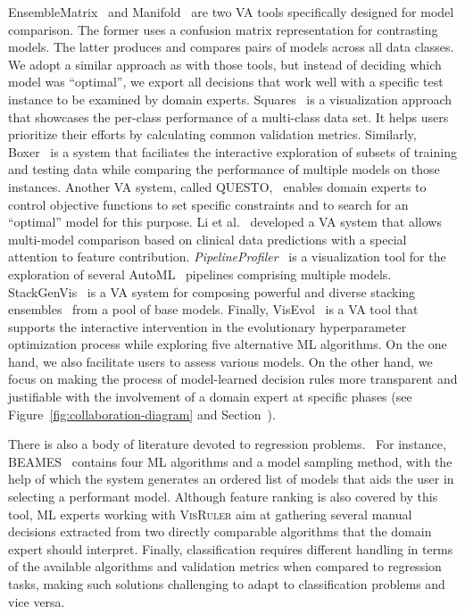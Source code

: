 EnsembleMatrix~\cite{Talbot2009EnsembleMatrix} and Manifold~\cite{Zhang2019Manifold} are two VA tools specifically designed for model comparison. The former uses a confusion matrix representation for contrasting models. The latter produces and compares pairs of models across all data classes. We adopt a similar approach as with those tools, but instead of deciding which model was ``optimal'', we export all decisions that work well with a specific test instance to be examined by domain experts. Squares~\cite{Squares2017Ren} is a visualization approach that showcases the per-class performance of a multi-class data set. It helps users prioritize their efforts by calculating common validation metrics. Similarly, Boxer~\cite{Gleicher2020Boxer} is a system that faciliates the interactive exploration of subsets of training and testing data while comparing the performance of multiple models on those instances. Another VA system, called QUESTO,~\cite{Das2020QUESTO} enables domain experts to control objective functions to set specific constraints and to search for an ``optimal'' model for this purpose. Li et al.~\cite{Li202020A} developed a VA system that allows multi-model comparison based on clinical data predictions with a special attention to feature contribution. \emph{PipelineProfiler}~\cite{Ono2021Pipeline} is a visualization tool for the exploration of several AutoML~\cite{automl} pipelines comprising multiple models. StackGenVis~\cite{Chatzimparmpas2021StackGenVis} is a VA system for composing powerful and diverse stacking ensembles~\cite{Wolpert1992Stacked} from a pool of base models. Finally, VisEvol~\cite{Chatzimparmpas2021VisEvol} is a VA tool that supports the interactive intervention in the evolutionary hyperparameter optimization process while exploring five alternative ML algorithms. On the one hand, we also facilitate users to assess various models. On the other hand, we focus on making the process of model-learned decision rules more transparent and justifiable with the involvement of a domain expert at specific phases (see Figure~\ref{fig:collaboration-diagram} and Section~).

There is also a body of literature devoted to regression problems.~\cite{Muhlbacher2013APartition,Sehgal2018Visual,Zhao2014LoVis,Das2019BEAMES} For instance, BEAMES~\cite{Das2019BEAMES} contains four ML algorithms and a model sampling method, with the help of which the system generates an ordered list of models that aids the user in selecting a performant model. Although feature ranking is also covered by this tool, ML experts working with \textsc{VisRuler} aim at gathering several manual decisions extracted from two directly comparable algorithms that the domain expert should interpret. Finally, classification requires different handling in terms of the available algorithms and validation metrics when compared to regression tasks, making such solutions challenging to adapt to classification problems and vice versa.